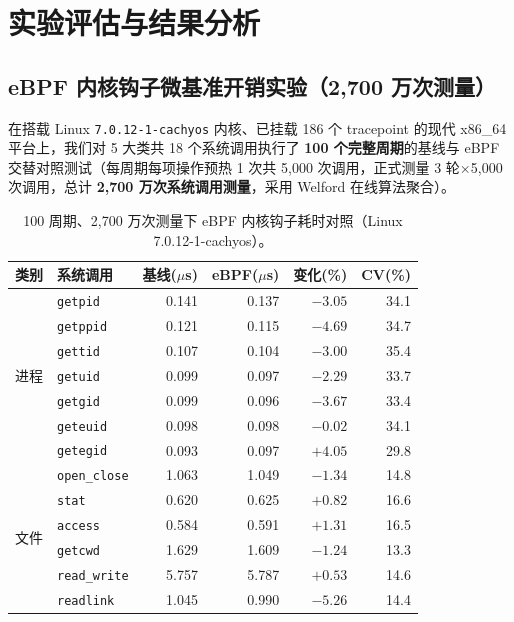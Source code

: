 \documentclass[UTF8,a4paper,zihao=-4,twocolumn]{ctexart}
\newcommand{\code}[1]{\texttt{\small #1}}
\begin{document}
\section{实验评估与结果分析}
\label{sec:eval}

\subsection{eBPF 内核钩子微基准开销实验（2,700 万次测量）}
在搭载 Linux \code{7.0.12-1-cachyos} 内核、已挂载 186 个 tracepoint 的现代 x86\_64 平台上，我们对 5 大类共 18 个系统调用执行了 \textbf{100 个完整周期}的基线与 eBPF 交替对照测试（每周期每项操作预热 1 次共 5,000 次调用，正式测量 3 轮×5,000 次调用，总计 \textbf{2,700 万次系统调用测量}，采用 Welford 在线算法聚合）。

\begin{table}[t]
\centering
\scriptsize
\setlength{\tabcolsep}{2.8pt}
\caption{100 周期、2,700 万次测量下 eBPF 内核钩子耗时对照（Linux 7.0.12-1-cachyos）。}
\label{tab:overhead_zh}
\begin{tabular}{@{}llrrrr@{}}
\toprule
\textbf{类别} & \textbf{系统调用} & \textbf{基线($\mu$s)} & \textbf{eBPF($\mu$s)} & \textbf{变化(\%)} & \textbf{CV(\%)} \\
\midrule
\multirow{7}{*}{进程}
 & \code{getpid}       & 0.141 & 0.137 & $-3.05$ & 34.1 \\
 & \code{getppid}      & 0.121 & 0.115 & $-4.69$ & 34.7 \\
 & \code{gettid}       & 0.107 & 0.104 & $-3.00$ & 35.4 \\
 & \code{getuid}       & 0.099 & 0.097 & $-2.29$ & 33.7 \\
 & \code{getgid}       & 0.099 & 0.096 & $-3.67$ & 33.4 \\
 & \code{geteuid}      & 0.098 & 0.098 & $-0.02$ & 34.1 \\
 & \code{getegid}      & 0.093 & 0.097 & $+4.05$ & 29.8 \\
\midrule
\multirow{6}{*}{文件}
 & \code{open\_close}  & 1.063 & 1.049 & $-1.34$ & 14.8 \\
 & \code{stat}         & 0.620 & 0.625 & $+0.82$ & 16.6 \\
 & \code{access}       & 0.584 & 0.591 & $+1.31$ & 16.5 \\
 & \code{getcwd}       & 1.629 & 1.609 & $-1.24$ & 13.3 \\
 & \code{read\_write}  & 5.757 & 5.787 & $+0.53$ & 14.6 \\
 & \code{readlink}     & 1.045 & 0.990 & $-5.26$ & 14.4 \\

\end{tabular}
\end{table}
\end{document}
